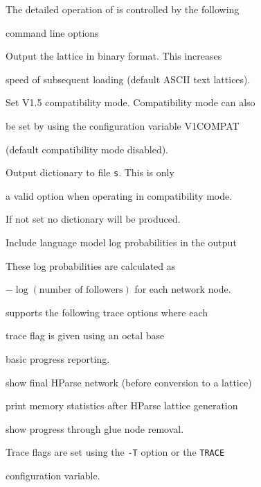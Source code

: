 The detailed operation of  is controlled by the following


command line options


\begin{optlist}


   Output the lattice in binary format. This increases


              speed of subsequent loading (default ASCII text lattices).





   Set V1.5 compatibility mode. Compatibility mode can also


              be set by using the configuration variable V1COMPAT


              (default compatibility mode disabled).





   Output dictionary to file {\tt s}. This is only


                a valid option when operating in compatibility mode.


                If not set no dictionary will be produced.





   Include language model log probabilities in the output


              These  log probabilities are calculated as 


              $-\log (\mbox{number of followers})$ for each network node.


\end{optlist}












 supports the following trace options where each


trace flag is given using an octal base


\begin{optlist}


    basic progress reporting.


    show final HParse network (before conversion to a lattice)


    print memory statistics after HParse lattice generation


    show progress through glue node removal.


\end{optlist}


Trace flags are set using the \texttt{-T} option or the  \texttt{TRACE} 


configuration variable.


















